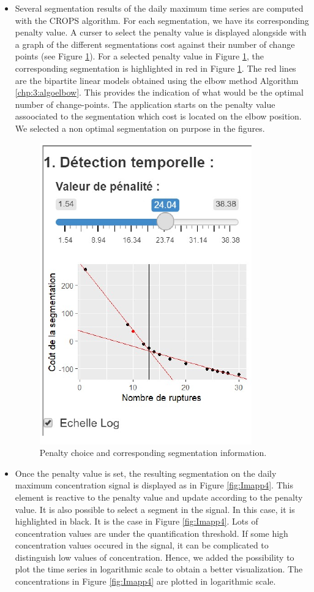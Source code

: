 \begin{itemize}
\item Several segmentation results of the daily maximum time series are computed with the CROPS algorithm. For each segmentation, we have its corresponding penalty value. A curser to select the penalty value is displayed alongside with a graph of the different segmentations cost against their number of change points (see Figure \ref{fig:Imapp3}). For a selected penalty value in Figure \ref{fig:Imapp3}, the corresponding segmentation is highlighted in red in Figure \ref{fig:Imapp3}. The red lines are the bipartite linear models obtained using the elbow method Algorithm \ref{chp:3:algoelbow}. This provides the indication of what would be the optimal number of change-points. The application starts on the penalty value assoociated to the segmentation which cost is located on the elbow position. We selected a non optimal segmentation on purpose in the figures. 
\begin{figure}[htbp]
  \centering
  \includegraphics[]{figs/Chap6/Im_appbis3.pdf}
  \caption{Penalty choice and corresponding segmentation information.}
  \label{fig:Imapp3}
\end{figure}
\item Once the penalty value is set, the resulting segmentation on the daily maximum concentration signal is displayed as in Figure \ref{fig:Imapp4}. This element is reactive to the penalty value and update according to the penalty value. It is also possible to select a segment in the signal. In this case, it is highlighted in black. It is the case in Figure \ref{fig:Imapp4}. Lots of concentration values are under the quantification threshold. If some high concentration values occured in the signal, it can be complicated to distinguish low values of concentration. Hence, we added the possibility to plot the time series in logarithmic scale to obtain a better visualization. The concentrations in Figure \ref{fig:Imapp4} are plotted in logarithmic scale.  

\end{itemize}
